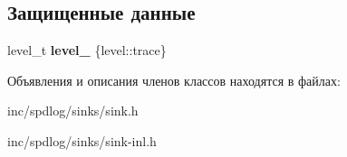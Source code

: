 \subsection*{Защищенные данные}
\begin{DoxyCompactItemize}
\item 
\mbox{\label{classspdlog_1_1sinks_1_1sink_a435da07b59e1165b38d53635cdada30a}} 
level\+\_\+t {\bfseries level\+\_\+} \{level\+::trace\}
\end{DoxyCompactItemize}


Объявления и описания членов классов находятся в файлах\+:\begin{DoxyCompactItemize}
\item 
inc/spdlog/sinks/sink.\+h\item 
inc/spdlog/sinks/sink-\/inl.\+h\end{DoxyCompactItemize}
